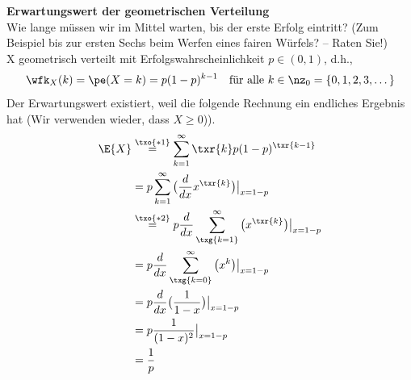 \begin{bsp}
    \textbf{Erwartungswert der geometrischen Verteilung}   \\
    Wie lange müssen wir im Mittel warten, bis der erste Erfolg eintritt?
    (Zum Beispiel bis zur ersten Sechs beim Werfen eines fairen Würfels?
    – Raten Sie!) \\
    X geometrisch verteilt mit Erfolgswahrscheinlichkeit \(p \in (0,1)\), d.h.,
    \[
        \wfk_X(k) = \pe (X=k) = p(1-p)^{k-1} \quad \text{für alle } k \in \nz_0 = \{0, 1, 2, 3, \dots \}
    \]
    Der Erwartungswert existiert, weil die folgende Rechnung ein endliches Ergebnis hat (Wir verwenden wieder, dass $X \geq 0$)).
    \txo{
        \[
            h(x) = x^k \Rightarrow h'(x) = k x^{k-1}
        \]
    }
    \begin{align*}
        \E{X}&  \overset{\txo{*1}}{=}   \sum^{\infty}_{k=1} \txr{k} p(1-p)^{\txr{k-1}} \\
        & =  p  \sum^{\infty}_{k=1} \big( \frac{d}{dx} x^{\txr{k}} \big) \big|_{x=1-p} \\
        &  \overset{\txo{*2}}{=}  p  \frac{d}{dx}   \sum^{\infty}_{\txg{k=1}} \big(x^{\txr{k}} \big) \big|_{x=1-p} \\
        & = p  \frac{d}{dx}   \sum^{\infty}_{\txg{k=0}} \big(x^{k} \big) \big|_{x=1-p} \\
        & = p  \frac{d}{dx}  \big( \frac{1}{1-x} \big) \big|_{x=1-p} \\
        & = p  \frac{1}{(1-x)^2}  \big|_{x=1-p} \\
        & = \frac{1}{p}
    \end{align*}
\end{bsp}

